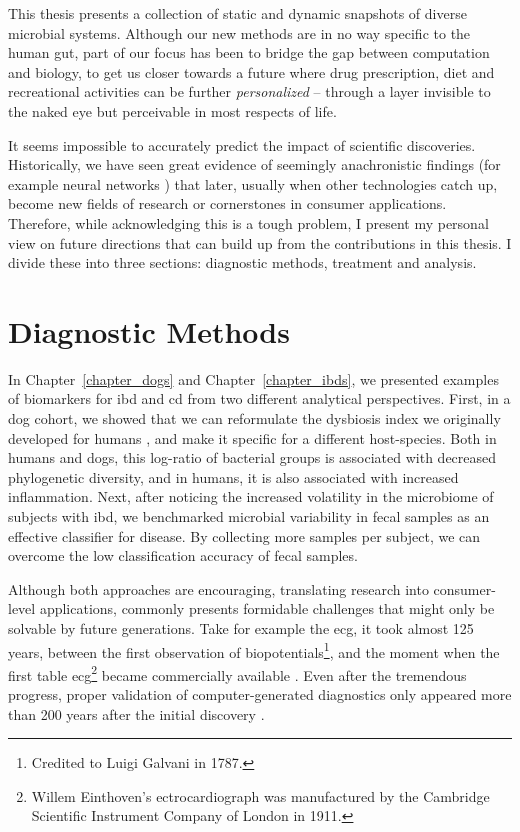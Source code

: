 This thesis presents a collection of static and dynamic snapshots of diverse
microbial systems. Although our new methods are in no way specific to the human
gut, part of our focus has been to bridge the gap between computation and
biology, to get us closer towards a future where drug prescription, diet and
recreational activities can be further \textit{personalized} -- through a layer
invisible to the naked eye but perceivable in most respects of life.

It seems impossible to accurately predict the impact of scientific discoveries.
Historically, we have seen great evidence of seemingly anachronistic findings 
(for example neural networks \cite{Tem10}) that later, usually when other 
technologies catch up, become new fields of research or cornerstones in 
consumer applications.  Therefore, while acknowledging this is a tough problem, 
I present my personal view on future directions that can build up from the 
contributions in this thesis. I divide these into three sections: diagnostic 
methods, treatment and analysis.

\section{Diagnostic Methods}

In Chapter~\ref{chapter_dogs} and Chapter~\ref{chapter_ibds}, we presented
examples of biomarkers for \gls{ibd} and \gls{cd} from two different analytical 
perspectives.  First, in a dog cohort, we showed that we can reformulate the 
dysbiosis index we originally developed for humans \cite{Gevers2014}, and make 
it specific for a different host\hyp{}species. Both in humans and dogs, this 
log-ratio of bacterial groups is associated with decreased phylogenetic 
diversity, and in humans, it is also associated with increased inflammation.  
Next, after noticing the increased volatility in the microbiome of subjects 
with \gls{ibd}, we benchmarked microbial variability in fecal samples as an 
effective classifier for disease. By collecting more samples per subject, we 
can overcome the low classification accuracy of fecal samples.

Although both approaches are encouraging, translating research into 
consumer\hyp{}level applications, commonly presents formidable challenges that 
might only be solvable by future generations.  Take for example the \gls{ecg}, 
it took almost 125 years, between the first observation of 
biopotentials\footnote{Credited to Luigi Galvani in 1787.}, and the moment when 
the first table \gls{ecg}\footnote{Willem Einthoven's ectrocardiograph was 
manufactured by the Cambridge Scientific Instrument Company of London in 1911.} 
became commercially available \cite{ECGZywietz}. Even after the tremendous 
progress, proper validation of computer-generated diagnostics only appeared 
more than 200 years after the initial discovery \cite{njem_ecg}.

